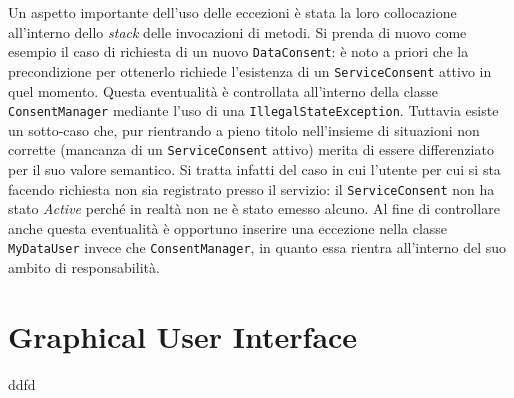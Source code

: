 Un aspetto importante dell’uso delle eccezioni \`e stata la loro collocazione all’interno dello \textit{stack} delle invocazioni di metodi. Si prenda di nuovo come esempio il caso di richiesta di un nuovo \texttt{DataConsent}: \`e noto a priori che la precondizione per ottenerlo richiede l’esistenza di un \texttt{ServiceConsent} attivo in quel momento. Questa eventualit\`a \`e controllata all’interno della classe \texttt{ConsentManager} mediante l’uso di una \texttt{IllegalStateException}. Tuttavia esiste un sotto-caso che, pur rientrando a pieno titolo nell’insieme di situazioni non corrette (mancanza di un \texttt{ServiceConsent} attivo) merita di essere differenziato per il suo valore semantico. Si tratta infatti del caso in cui l’utente per cui si sta facendo richiesta non sia registrato presso il servizio: il \texttt{ServiceConsent} non ha stato \textit{Active} perch\'e in realt\`a non ne \`e stato emesso alcuno. Al fine di controllare anche questa eventualit\`a \`e opportuno inserire una eccezione nella classe \texttt{MyDataUser} invece che \texttt{ConsentManager}, in quanto essa rientra all’interno del suo ambito di responsabilità.

\section{Graphical User Interface}
ddfd